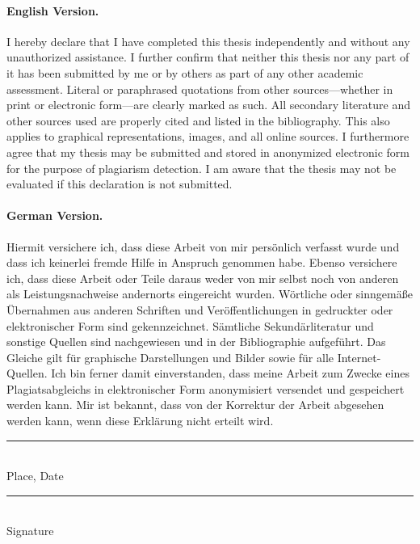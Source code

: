\documentclass[
11pt, %
english, %
singlespacing, %
headsepline, %
]{MastersThesis} %
\theoremstyle{definition}
\theoremstyle{plain}
\theoremstyle{remark}
\theoremstyle{remark}
\begin{document}

\begin{declaration}
\addchaptertocentry{\authorshipname} %

\paragraph{English Version.} I hereby declare that I have completed this thesis
independently and without any unauthorized assistance. I further confirm that
neither this thesis nor any part of it has been submitted by me or by others as
part of any other academic assessment. Literal or paraphrased quotations from
other sources—whether in print or electronic form—are clearly marked as such.
All secondary literature and other sources used are properly cited and listed in
the bibliography. This also applies to graphical representations, images, and
all online sources. I furthermore agree that my thesis may be submitted and
stored in anonymized electronic form for the purpose of plagiarism detection. I
am aware that the thesis may not be evaluated if this declaration is not
submitted.

\paragraph{German Version.} Hiermit versichere ich, dass diese Arbeit von mir
persönlich verfasst wurde und dass ich keinerlei fremde Hilfe in Anspruch
genommen habe. Ebenso versichere ich, dass diese Arbeit oder Teile daraus weder
von mir selbst noch von anderen als Leistungsnachweise andernorts eingereicht
wurden. Wörtliche oder sinngemäße Übernahmen aus anderen Schriften und
Veröffentlichungen in gedruckter oder elektronischer Form sind gekennzeichnet.
Sämtliche Sekundärliteratur und sonstige Quellen sind nachgewiesen und in der
Bibliographie aufgeführt. Das Gleiche gilt für graphische Darstellungen und
Bilder sowie für alle Internet-Quellen. Ich bin ferner damit einverstanden, dass
meine Arbeit zum Zwecke eines Plagiatsabgleichs in elektronischer Form
anonymisiert versendet und gespeichert werden kann. Mir ist bekannt, dass von
der Korrektur der Arbeit abgesehen werden kann, wenn diese Erklärung nicht
erteilt wird.
\vspace{1.5cm}

\begin{flushleft}
  \begin{minipage}[t]{0.5\textwidth}
    \noindent\rule[0.5em]{18em}{0.5pt} \\[0em] %
    Place, Date
  \end{minipage}%
  \begin{minipage}[t]{0.45\textwidth}
    \raggedleft
    \noindent\rule[0.5em]{12em}{0.5pt} \\[0em] %
    Signature
  \end{minipage}
\end{flushleft}
\end{declaration}
\end{document}

